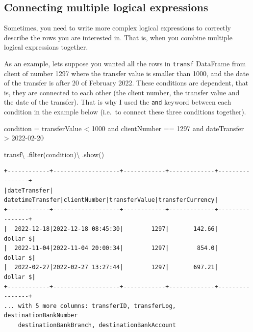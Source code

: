 \documentclass[
  11pt,
  letterpaper,
  DIV=11,
  numbers=noendperiod]{scrreprt}
\newenvironment{Shaded}{\begin{snugshade}}{\end{snugshade}}
\newcommand{\BuiltInTok}[1]{\textcolor[rgb]{0.00,0.23,0.31}{#1}}
\newcommand{\NormalTok}[1]{\textcolor[rgb]{0.00,0.23,0.31}{#1}}
\newcommand{\OperatorTok}[1]{\textcolor[rgb]{0.37,0.37,0.37}{#1}}
\newcommand{\StringTok}[1]{\textcolor[rgb]{0.13,0.47,0.30}{#1}}
\begin{document}
\hypertarget{connecting-multiple-logical-expressions}{%
\subsection{Connecting multiple logical
expressions}\label{connecting-multiple-logical-expressions}}

Sometimes, you need to write more complex logical expressions to
correctly describe the rows you are interested in. That is, when you
combine multiple logical expressions together.

As an example, lets suppose you wanted all the rows in \texttt{transf}
DataFrame from client of number 1297 where the transfer value is smaller
than 1000, and the date of the transfer is after 20 of February 2022.
These conditions are dependent, that is, they are connected to each
other (the client number, the transfer value and the date of the
transfer). That is why I used the \texttt{and} keyword between each
condition in the example below (i.e.~to connect these three conditions
together).

\begin{Shaded}
\begin{Highlighting}[]
\NormalTok{condition }\OperatorTok{=} \StringTok{\textquotesingle{}\textquotesingle{}\textquotesingle{}}
\StringTok{  transferValue \textless{} 1000}
\StringTok{  and clientNumber == 1297 }
\StringTok{  and dateTransfer \textgreater{} \textquotesingle{}2022{-}02{-}20\textquotesingle{}}
\StringTok{\textquotesingle{}\textquotesingle{}\textquotesingle{}}

\NormalTok{transf}\OperatorTok{\textbackslash{}}
\NormalTok{  .}\BuiltInTok{filter}\NormalTok{(condition)}\OperatorTok{\textbackslash{}}
\NormalTok{  .show()}
\end{Highlighting}
\end{Shaded}

\begin{verbatim}
+------------+-------------------+------------+-------------+----------------+
|dateTransfer|   datetimeTransfer|clientNumber|transferValue|transferCurrency|
+------------+-------------------+------------+-------------+----------------+
|  2022-12-18|2022-12-18 08:45:30|        1297|       142.66|        dollar $|
|  2022-11-04|2022-11-04 20:00:34|        1297|        854.0|        dollar $|
|  2022-02-27|2022-02-27 13:27:44|        1297|       697.21|        dollar $|
+------------+-------------------+------------+-------------+----------------+
... with 5 more columns: transferID, transferLog, destinationBankNumber
    destinationBankBranch, destinationBankAccount
\end{verbatim}
\end{document}

